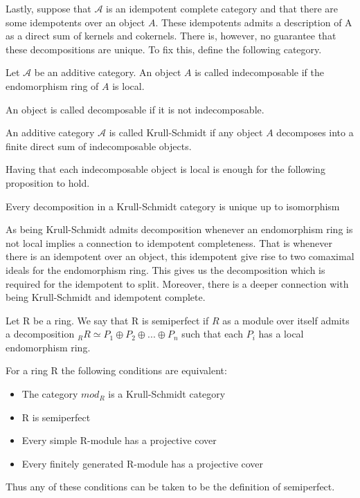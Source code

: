     Lastly, suppose that $\mathcal{A}$ is an idempotent complete category and that there are some idempotents over an object $A$. These idempotents admits a description of A as a direct sum of kernels and cokernels. There is, however, no guarantee that these decompositions are unique. To fix this, define the following category.

    \begin{definition}
        Let $\mathcal{A}$ be an additive category. An object $A$ is called indecomposable if the endomorphism ring of $A$ is local.

        An object is called decomposable if it is not indecomposable.
    \end{definition}

    \begin{definition}
        An additive category $\mathcal{A}$ is called Krull-Schmidt if any object $A$ decomposes into a finite direct sum of indecomposable objects.
    \end{definition}

    Having that each indecomposable object is local is enough for the following proposition to hold.

    \begin{prop}
        Every decomposition in a Krull-Schmidt category is unique up to isomorphism
    \end{prop}

    As being Krull-Schmidt admits decomposition whenever an endomorphism ring is not local implies a connection to idempotent completeness. That is whenever there is an idempotent over an object, this idempotent give rise to two comaximal ideals for the endomorphism ring. This gives us the decomposition which is required for the idempotent to split. Moreover, there is a deeper connection with being Krull-Schmidt and idempotent complete.

    \begin{definition}
        Let R be a ring. We say that R is semiperfect if $R$ as a module over itself admits a decomposition $_RR\simeq P_1\oplus P_2\oplus ... \oplus P_n$ such that each $P_i$ has a local endomorphism ring.
    \end{definition}

    \begin{remark}
        For a ring R the following conditions are equivalent:
        \begin{itemize}
            \item The category $mod_R$ is a Krull-Schmidt category
            \item R is semiperfect
            \item Every simple R-module has a projective cover
            \item Every finitely generated R-module has a projective cover
        \end{itemize}
        Thus any of these conditions can be taken to be the definition of semiperfect.
    \end{remark}

